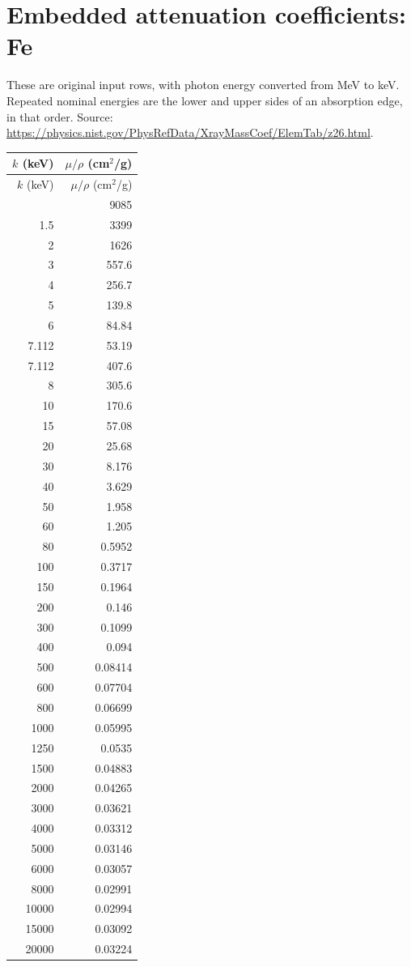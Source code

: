 \documentclass[10pt,a4paper]{article}
\begin{document}
\section{Embedded attenuation coefficients: Fe}
These are original input rows, with photon energy converted from MeV to keV. Repeated nominal energies are the lower and upper sides of an absorption edge, in that order. Source: \url{https://physics.nist.gov/PhysRefData/XrayMassCoef/ElemTab/z26.html}.
\small
\begin{longtable}{rr}
\toprule
$k$ (keV) & $\mu/\rho$ (cm$^2$/g) \\
\midrule
\endfirsthead
\toprule
$k$ (keV) & $\mu/\rho$ (cm$^2$/g) \\
\midrule
\endhead
\bottomrule
\endfoot
1 & 9085 \\
1.5 & 3399 \\
2 & 1626 \\
3 & 557.6 \\
4 & 256.7 \\
5 & 139.8 \\
6 & 84.84 \\
7.112 & 53.19 \\
7.112 & 407.6 \\
8 & 305.6 \\
10 & 170.6 \\
15 & 57.08 \\
20 & 25.68 \\
30 & 8.176 \\
40 & 3.629 \\
50 & 1.958 \\
60 & 1.205 \\
80 & 0.5952 \\
100 & 0.3717 \\
150 & 0.1964 \\
200 & 0.146 \\
300 & 0.1099 \\
400 & 0.094 \\
500 & 0.08414 \\
600 & 0.07704 \\
800 & 0.06699 \\
1000 & 0.05995 \\
1250 & 0.0535 \\
1500 & 0.04883 \\
2000 & 0.04265 \\
3000 & 0.03621 \\
4000 & 0.03312 \\
5000 & 0.03146 \\
6000 & 0.03057 \\
8000 & 0.02991 \\
10000 & 0.02994 \\
15000 & 0.03092 \\
20000 & 0.03224 \\
\end{longtable}
\normalsize
\clearpage
\end{document}
